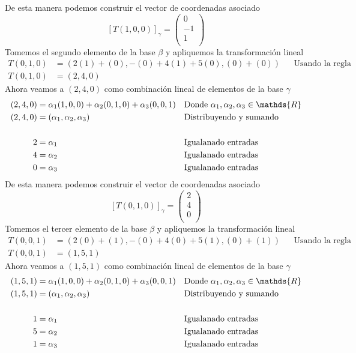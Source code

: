 \documentclass[letterpaper]{article}
\newcommand{\R}{\mathds{R}}
\renewcommand{\*}{\cdot}
\theoremstyle{definition}
\begin{document}
		De esta manera podemos construir el vector de coordenadas asociado
		\[ [T(1,0,0)]_{\gamma} = \begin{pmatrix}
		0\\
		-1\\
		1\\
		\end{pmatrix}  \]
		Tomemos el segundo elemento de la base $ \beta $ y apliquemos la transformación lineal
		\begin{align*}
		T(0,1,0) &= (2(1)+ (0), -(0) + 4(1) + 5(0),(0) +(0)) && \text{Usando la regla de correspondencia}\\
		T(0,1,0) &= (2,4,0) &&
		\end{align*}
		Ahora veamos a $ (2,4,0) $ como combinación lineal de elementos de la base $ \gamma $
		\begin{align*}
		(2,4,0) &= \alpha_1(1,0,0) + \alpha_2(0,1,0) + \alpha_3(0,0,1) && \text{Donde $ \alpha_1,\alpha_2,\alpha_3 \in \R$}\\
		(2,4,0) &= ( \alpha_1,  \alpha_2,  \alpha_3) && \text{Distribuyendo y sumando}\\
		\\
		2 &= \alpha_1 && \text{Igualanado entradas}\\
		4 &= \alpha_2 && \text{Igualanado entradas}\\
		0 &= \alpha_3 && \text{Igualanado entradas}\\
		\end{align*}
		De esta manera podemos construir el vector de coordenadas asociado
		\[ [T(0,1,0)]_{\gamma} = \begin{pmatrix}
		2\\
		4\\
		0\\
		\end{pmatrix}  \]
		Tomemos el tercer elemento de la base $ \beta $ y apliquemos la transformación lineal
		\begin{align*}
		T(0,0,1) &= (2(0)+ (1), -(0) + 4(0) + 5(1),(0) +(1)) && \text{Usando la regla de correspondencia}\\
		T(0,0,1) &= (1,5,1) &&
		\end{align*}
		Ahora veamos a $ (1,5,1) $ como combinación lineal de elementos de la base $ \gamma $
		\begin{align*}
		(1,5,1) &= \alpha_1(1,0,0) + \alpha_2(0,1,0) + \alpha_3(0,0,1) && \text{Donde $ \alpha_1,\alpha_2,\alpha_3 \in \R$}\\
		(1,5,1) &= ( \alpha_1,  \alpha_2,  \alpha_3) && \text{Distribuyendo y sumando}\\
		\\
		1 &= \alpha_1 && \text{Igualanado entradas}\\
		5 &= \alpha_2 && \text{Igualanado entradas}\\
		1 &= \alpha_3 && \text{Igualanado entradas}\\
		\end{align*}
\end{document}
